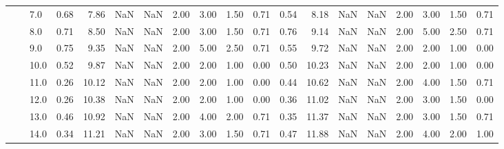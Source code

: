 \begin{tabular}{lllrrrrrrrrrrrrrrrr}
       &     & 7.0  &      0.68 &       7.86 &               NaN &                NaN & 2.00 &   3.00 &             1.50 &                         0.71 &      0.54 &       8.18 &               NaN &                NaN & 2.00 &   3.00 &             1.50 &                         0.71 \\
       &     & 8.0  &      0.71 &       8.50 &               NaN &                NaN & 2.00 &   3.00 &             1.50 &                         0.71 &      0.76 &       9.14 &               NaN &                NaN & 2.00 &   5.00 &             2.50 &                         0.71 \\
       &     & 9.0  &      0.75 &       9.35 &               NaN &                NaN & 2.00 &   5.00 &             2.50 &                         0.71 &      0.55 &       9.72 &               NaN &                NaN & 2.00 &   2.00 &             1.00 &                         0.00 \\
       &     & 10.0 &      0.52 &       9.87 &               NaN &                NaN & 2.00 &   2.00 &             1.00 &                         0.00 &      0.50 &      10.23 &               NaN &                NaN & 2.00 &   2.00 &             1.00 &                         0.00 \\
       &     & 11.0 &      0.26 &      10.12 &               NaN &                NaN & 2.00 &   2.00 &             1.00 &                         0.00 &      0.44 &      10.62 &               NaN &                NaN & 2.00 &   4.00 &             1.50 &                         0.71 \\
       &     & 12.0 &      0.26 &      10.38 &               NaN &                NaN & 2.00 &   2.00 &             1.00 &                         0.00 &      0.36 &      11.02 &               NaN &                NaN & 2.00 &   3.00 &             1.50 &                         0.00 \\
       &     & 13.0 &      0.46 &      10.92 &               NaN &                NaN & 2.00 &   4.00 &             2.00 &                         0.71 &      0.35 &      11.37 &               NaN &                NaN & 2.00 &   3.00 &             1.50 &                         0.71 \\
       &     & 14.0 &      0.34 &      11.21 &               NaN &                NaN & 2.00 &   3.00 &             1.50 &                         0.71 &      0.47 &      11.88 &               NaN &                NaN & 2.00 &   4.00 &             2.00 &                         1.00 \\

\end{tabular}
